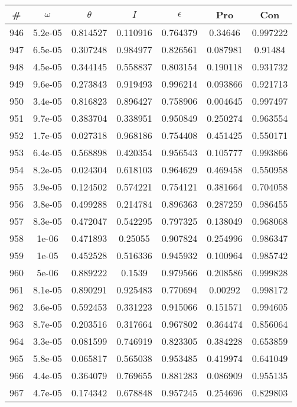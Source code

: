 \newpage
\begin{table}
\begin{tabular}{c|c|c|c|c|c|c}
\# & $\omega$ & $\theta$ & $I$ & $\epsilon$ & Pro & Con\\
\hline
946 & 5.2e-05 & 0.814527 & 0.110916 & 0.764379 & 0.34646 & 0.997222\\
947 & 6.5e-05 & 0.307248 & 0.984977 & 0.826561 & 0.087981 & 0.91484\\
948 & 4.5e-05 & 0.344145 & 0.558837 & 0.803154 & 0.190118 & 0.931732\\
949 & 9.6e-05 & 0.273843 & 0.919493 & 0.996214 & 0.093866 & 0.921713\\
950 & 3.4e-05 & 0.816823 & 0.896427 & 0.758906 & 0.004645 & 0.997497\\
951 & 9.7e-05 & 0.383704 & 0.338951 & 0.950849 & 0.250274 & 0.963554\\
952 & 1.7e-05 & 0.027318 & 0.968186 & 0.754408 & 0.451425 & 0.550171\\
953 & 6.4e-05 & 0.568898 & 0.420354 & 0.956543 & 0.105777 & 0.993866\\
954 & 8.2e-05 & 0.024304 & 0.618103 & 0.964629 & 0.469458 & 0.550958\\
955 & 3.9e-05 & 0.124502 & 0.574221 & 0.754121 & 0.381664 & 0.704058\\
956 & 3.8e-05 & 0.499288 & 0.214784 & 0.896363 & 0.287259 & 0.986455\\
957 & 8.3e-05 & 0.472047 & 0.542295 & 0.797325 & 0.138049 & 0.968068\\
958 & 1e-06 & 0.471893 & 0.25055 & 0.907824 & 0.254996 & 0.986347\\
959 & 1e-05 & 0.452528 & 0.516336 & 0.945932 & 0.100964 & 0.985742\\
960 & 5e-06 & 0.889222 & 0.1539 & 0.979566 & 0.208586 & 0.999828\\
961 & 8.1e-05 & 0.890291 & 0.925483 & 0.770694 & 0.00292 & 0.998172\\
962 & 3.6e-05 & 0.592453 & 0.331223 & 0.915066 & 0.151571 & 0.994605\\
963 & 8.7e-05 & 0.203516 & 0.317664 & 0.967802 & 0.364474 & 0.856064\\
964 & 3.3e-05 & 0.081599 & 0.746919 & 0.823305 & 0.384228 & 0.653859\\
965 & 5.8e-05 & 0.065817 & 0.565038 & 0.953485 & 0.419974 & 0.641049\\
966 & 4.4e-05 & 0.364079 & 0.769655 & 0.881283 & 0.086909 & 0.955135\\
967 & 4.7e-05 & 0.174342 & 0.678848 & 0.957245 & 0.254696 & 0.829803\\

\end{tabular}
\end{table}
